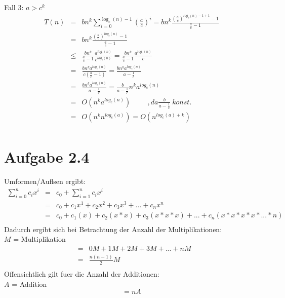   Fall 3: $a > c^{k}$
  \begin{eqnarray}
  T(n) &=& bn^{k} \sum\limits_{i=0}^{\log_{c}(n) - 1}{({\frac{a}{c}})}^{i} = bn^{k} \frac{{(\frac{a}{c})}^{log_{c}(n)- 1 +1} - 1}{\frac{a}{c} - 1}\\
  &=& bn^{k} \frac{{(\frac{a}{c})}^{log_{c}(n)} - 1}{\frac{a}{c} - 1}\\
  &\leq& \frac{bn^{k}}{\frac{a}{c}-1} \frac{a^{log_{c}(n)}}{c^{log_{c}(n)}} = \frac{bn^{k}}{\frac{a}{c}-1} \frac{a^{log_{c}(n)}}{c}\\
  &=& \frac{bn^{k} a^{log_{c}(n)}}{c(\frac{a}{c} - 1)} = \frac{bn^{k} a^{log_{c}(n)}}{a- \frac{1}{c}}\\
  &=& \frac{bn^{k} a^{log_{c}(n)}}{a - \frac{1}{c}} = \frac{b}{a - \frac{1}{c}} n^{k}a^{log_{c}(n)}\\
  &=& O(n^{k}a^{log_{c}(n)}) \hspace{1cm}, da \frac{b}{a - \frac{1}{c}} \ konst.\\
  &=& O(n^{k}n^{log_{c}(a)}) = O(n^{log_{c}(a)+ k} )\\ 
  \end{eqnarray}
  
  

\section*{Aufgabe 2.4}

Umformen/Aufl\ouml sen ergibt:\\
\begin{eqnarray*}
\sum\limits_{i=0}^{n}{c_i x^i} &=& c_0 + \sum\limits_{i=1}^{n}{c_i x^i}\\
&=& c_0 + c_1 x^1 + c_2 x^2 + c_3 x^3 + ... + c_n x^n\\
&=& c_0 + c_1 (x) + c_2 (x * x) + c_3 (x * x * x) + ... + c_n (x * x * x * x * ... *n)\\
\end{eqnarray*}
Dadurch ergibt sich bei Betrachtung der Anzahl der Multiplikationen:\\
$M$ = Multiplikation
\begin{eqnarray*}
&=& 0M + 1M + 2M + 3M + ... + nM\\
&=& \frac{n (n - 1)}{2}M\\
\end{eqnarray*}
Offensichtlich gilt fuer die Anzahl der Additionen:\\
$A$ = Addition
\begin{equation*}
= nA
\end{equation*}

